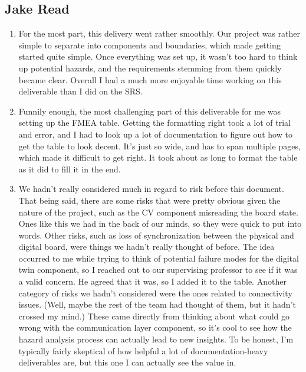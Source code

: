 \documentclass{article}
\begin{document}
\subsection*{Jake Read}\label{subsec:jake-read-reflection}
\begin{enumerate}
    \item For the most part, this delivery went rather smoothly.
    Our project was rather simple to separate into components and boundaries, which made getting started quite simple.
    Once everything was set up, it wasn't too hard to think up potential hazards, and the requirements stemming from them quickly became clear.
    Overall I had a much more enjoyable time working on this deliverable than I did on the SRS.

    \item Funnily enough, the most challenging part of this deliverable for me was setting up the FMEA table.
    Getting the formatting right took a lot of trial and error, and I had to look up a lot of documentation to figure out how to get the table to look decent.
    It's just so wide, and has to span multiple pages, which made it difficult to get right.
    It took about as long to format the table as it did to fill it in the end.

    \item We hadn't really considered much in regard to risk before this document.
    That being said, there are some risks that were pretty obvious given the nature of the project, such as the CV component misreading the board state.
    Ones like this we had in the back of our minds, so they were quick to put into words.
    Other risks, such as loss of synchronization between the physical and digital board, were things we hadn't really thought of before.
    The idea occurred to me while trying to think of potential failure modes for the digital twin component, so I reached out to our supervising professor to see if it was a valid concern.
    He agreed that it was, so I added it to the table.
    Another category of risks we hadn't considered were the ones related to connectivity issues.
    (Well, maybe the rest of the team had thought of them, but it hadn't crossed my mind.)
    These came directly from thinking about what could go wrong with the communication layer component, so it's cool to see how the hazard analysis process can actually lead to new insights.
    To be honest, I'm typically fairly skeptical of how helpful a lot of documentation-heavy deliverables are, but this one I can actually see the value in.


\end{enumerate}
\end{document}
